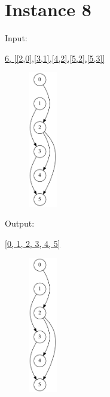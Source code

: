 \documentclass[10pt]{article}
\begin{document}
\newpage

\section*{Instance 8}

\squishlist
  \item \parbox{40pt}{Input:}  \url{6, [[2,0],[3,1],[4,2],[5,2],[5,3]]}
\squishend
\begin{figure}[h!]
  \hspace{50pt}
  \hspace{50pt}
  \hspace{50pt}
  \includegraphics[width=35pt]{Input/Graph_8b.gv.png}
\end{figure}

\squishlist
  \item \parbox{40pt}{Output:} \url{[0, 1, 2, 3, 4, 5]}
\squishend
\begin{figure}[h!]
  \hspace{50pt}
  \includegraphics[width=35pt]{Output/Graph_8_soln.gv.png}
\end{figure}
\end{document}
